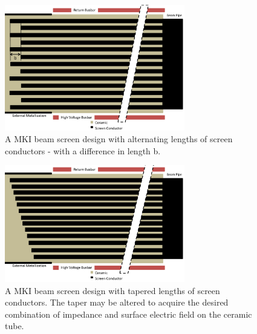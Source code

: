 \begin{figure}
\begin{center}
\includegraphics[width=0.7\textwidth]{LHC_MKI/figures/mki-design-layouts/alternating_screen_conductors.pdf}
\end{center}
\caption{A MKI beam screen design with alternating lengths of screen conductors - with a difference in length b.}
\label{fig:24-alternating-length}
\end{figure}
\begin{figure}
\begin{center}
\includegraphics[width=0.7\textwidth]{LHC_MKI/figures/mki-design-layouts/shortening_screen_conductors.pdf}
\end{center}
\caption{A MKI beam screen design with tapered lengths of screen conductors. The taper may be altered to acquire the desired combination of impedance and surface electric field on the ceramic tube.}
\label{fig:24-tapered-length}
\end{figure}
